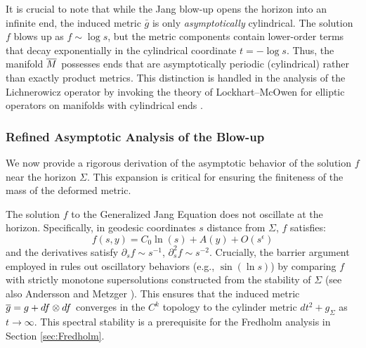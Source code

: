 \begin{remark}\label{rem:AsymptoticCyl}
It is crucial to note that while the Jang blow-up opens the horizon into an infinite end, the induced metric $\bar{g}$ is only \emph{asymptotically} cylindrical. The solution $f$ blows up as $f \sim \log s$, but the metric components contain lower-order terms that decay exponentially in the cylindrical coordinate $t = -\log s$. Thus, the manifold $\overline{M}$ possesses ends that are asymptotically periodic (cylindrical) rather than exactly product metrics. This distinction is handled in the analysis of the Lichnerowicz operator by invoking the theory of Lockhart--McOwen for elliptic operators on manifolds with cylindrical ends \cite{lockhartmccowen1985}.
\end{remark}

\subsubsection{Refined Asymptotic Analysis of the Blow-up}
We now provide a rigorous derivation of the asymptotic behavior of the solution $f$ near the horizon $\Sigma$. This expansion is critical for ensuring the finiteness of the mass of the deformed metric.


\begin{lemma}\label{lem:NonOscillatory}
The solution $f$ to the Generalized Jang Equation does not oscillate at the horizon. Specifically, in geodesic coordinates $s$ distance from $\Sigma$, $f$ satisfies:
\[ f(s,y) = C_0 \ln(s) + A(y) + O(s^\epsilon) \]
and the derivatives satisfy $\partial_s f \sim s^{-1}$, $\partial^2_s f \sim s^{-2}$. Crucially, the barrier argument employed in \cite{hankhuri2013} rules out oscillatory behaviors (e.g., $\sin(\ln s)$) by comparing $f$ with strictly monotone supersolutions constructed from the stability of $\Sigma$ (see also Andersson and Metzger \cite{anderssonmetzger2009}).
This ensures that the induced metric $\overline{g} = g + df \otimes df$ converges in the $C^k$ topology to the cylinder metric $dt^2 + g_\Sigma$ as $t \to \infty$. This spectral stability is a prerequisite for the Fredholm analysis in Section \ref{sec:Fredholm}.
\end{lemma}


